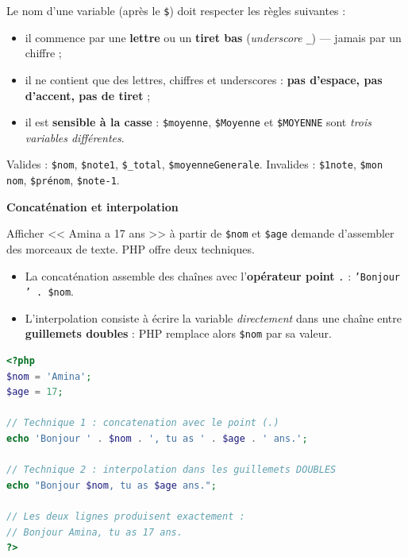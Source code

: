 \documentclass[11pt]{article}
\newcommand{\cle}[1]{{\popxbold\color{popdark}#1}}
\begin{document}
\begin{propriete}
Le nom d'une variable (après le \texttt{\$}) doit respecter les règles suivantes :
\begin{itemize}
\item il commence par une \textbf{lettre} ou un \textbf{tiret bas} (\emph{underscore} \texttt{\_}) — jamais par un chiffre ;
\item il ne contient que des lettres, chiffres et underscores : \textbf{pas d'espace, pas d'accent, pas de tiret} ;
\item il est \textbf{sensible à la casse} : \texttt{\$moyenne}, \texttt{\$Moyenne} et \texttt{\$MOYENNE} sont \emph{trois variables différentes}.
\end{itemize}
Valides : \texttt{\$nom}, \texttt{\$note1}, \texttt{\$\_total}, \texttt{\$moyenneGenerale}. \quad
Invalides : \texttt{\$1note}, \texttt{\$mon nom}, \texttt{\$prénom}, \texttt{\$note-1}.
\end{propriete}

\textbf{Concaténation et interpolation}\par

Afficher << Amina a 17 ans >> à partir de \texttt{\$nom} et \texttt{\$age} demande d'assembler des morceaux de texte. PHP offre deux techniques.

\begin{definition}
\begin{itemize}
\item La \cle{concaténation} assemble des chaînes avec l'\textbf{opérateur point} \texttt{.} : \texttt{'Bonjour ' . \$nom}.
\item L'\cle{interpolation} consiste à écrire la variable \emph{directement} dans une chaîne entre \textbf{guillemets doubles} : PHP remplace alors \texttt{\$nom} par sa valeur.
\end{itemize}
\end{definition}

\begin{exemplebox}
\begin{lstlisting}[language=Php]
<?php
$nom = 'Amina';
$age = 17;

// Technique 1 : concatenation avec le point (.)
echo 'Bonjour ' . $nom . ', tu as ' . $age . ' ans.';

// Technique 2 : interpolation dans les guillemets DOUBLES
echo "Bonjour $nom, tu as $age ans.";

// Les deux lignes produisent exactement :
// Bonjour Amina, tu as 17 ans.
?>
\end{lstlisting}
\end{exemplebox}
\end{document}
